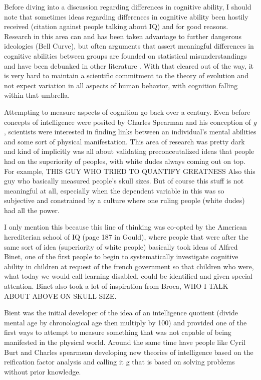 \documentclass[]{book}
\theoremstyle{definition}
\theoremstyle{definition}
\theoremstyle{definition}
\theoremstyle{remark}
\begin{document}
Before diving into a discussion regarding differences in cognitive
ability, I should note that sometimes ideas regarding differences in
cognitive ability been hostily received (citation against people talking
about IQ) and for good reasons. Research in this area can and has been
taken advantage to further dangerous ideologies (Bell Curve), but often
arguments that assert meaningful differences in cognitive abilities
between groups are founded on statistical misunderstandings and have
been debunked in other literature \citep{gouldMismeasureMan1996}. With
that cleared out of the way, it is very hard to maintain a scientific
commitment to the theory of evolution \citep{darwinOriginSpecies1859}
and not expect variation in all aspects of human behavior, with
cognition falling within that umbrella.

Attempting to measure aspects of cognition go back over a century. Even
before concepts of intelligence were posited by Charles Spearman and his
conception of \emph{g}
\citep{spearmanGeneralIntelligenceObjectively1904}, scientists were
interested in finding links between an individual's mental abilities and
some sort of physical manifestation. This area of research was pretty
dark and kind of implicitly was all about validating preconceutalized
ideas that people had on the superiority of peoples, with white dudes
always coming out on top. For example, THIS GUY WHO TRIED TO QUANTIFY
GREATNESS Also this guy who basically measured people's skull sizes. But
of course this stuff is not meaningful at all, especially when the
dependent variable in this was so subjective and constrained by a
culture where one ruling people (white dudes) had all the power.

I only mention this because this line of thinking was co-opted by the
American herediterian school of IQ (page 187 in Gould), where people
that were after the same sort of idea (superiority of white people)
basically took ideas of Alfred Binet, one of the first people to begin
to systematically investigate cognitive ability in children at request
of the french government so that children who were, what today we would
call learning disabled, could be identified and given special attention.
Binet also took a lot of inspiration from Broca, WHO I TALK ABOUT ABOVE
ON SKULL SIZE.

Bient was the initial developer of the idea of an intelligence quotient
(divide mental age by chronological age then multiply by 100) and
provided one of the first ways to attempt to measure something that was
not capable of being manifested in the physical world. Around the same
time have people like Cyril Burt and Charles spearmean developing new
theories of intelligence based on the reification factor analysis and
calling it g that is based on solving problems without prior knowledge.
\end{document}
